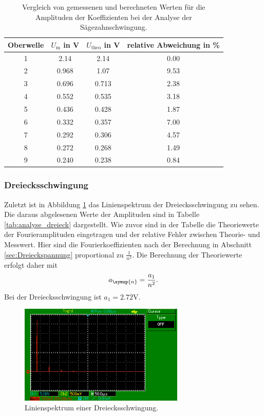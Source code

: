 \begin{table}
  \centering
  \begin{tabular}{c c c c}
    \toprule
    Oberwelle & $U_\text{m}$ in \si{\volt} & $U_\text{theo}$ in \si{\volt} &
    relative Abweichung in \% \\
    \midrule
    1 & 2.14  & 2.14  & 0.00 \\
    2 & 0.968 & 1.07  & 9.53 \\
    3 & 0.696 & 0.713 & 2.38 \\
    4 & 0.552 & 0.535 & 3.18 \\
    5 & 0.436 & 0.428 & 1.87 \\
    6 & 0.332 & 0.357 & 7.00 \\
    7 & 0.292 & 0.306 & 4.57 \\
    8 & 0.272 & 0.268 & 1.49 \\
    9 & 0.240 & 0.238 & 0.84 \\
    \bottomrule
  \end{tabular}
  \caption{Vergleich von gemessenen und berechneten Werten für die Amplituden
    der Koeffizienten bei der Analyse der Sägezahnschwingung.}
  \label{tab:analyse_saegezahn}
\end{table}

\subsubsection{Dreiecksschwingung}
Zuletzt ist in Abbildung \ref{fig:linienspektrum_dreieck} das Linienspektrum der
Dreiecksschwingung zu sehen. Die daraus abgelesenen Werte der Amplituden sind in
Tabelle \ref{tab:analyse_dreieck} dargestellt. Wie zuvor sind in der Tabelle
die Theoriewerte der Fourieramplituden eingetragen und der relative Fehler
zwischen Theorie- und Messwert.
Hier sind die Fourierkoeffizienten nach der Berechnung in Abschnitt \ref{sec:Dreieckspannung}
proportional zu $\frac{1}{n^2}$. Die Berechnung der Theoriewerte erfolgt daher mit
\begin{equation}
  a_\symup{n} = \frac{a_1}{n^2}.
  \label{eqn:a_n_dreieck}
\end{equation}
Bei der Dreiecksschwingung ist $a_1 = 2.72 \si{\volt}$.

\begin{figure}
  \centering
  \includegraphics[width=0.7\textwidth]{linienspektrum_dreieck.png}
  \caption{Linienspektrum einer Dreiecksschwingung.}
  \label{fig:linienspektrum_dreieck}
\end{figure}

